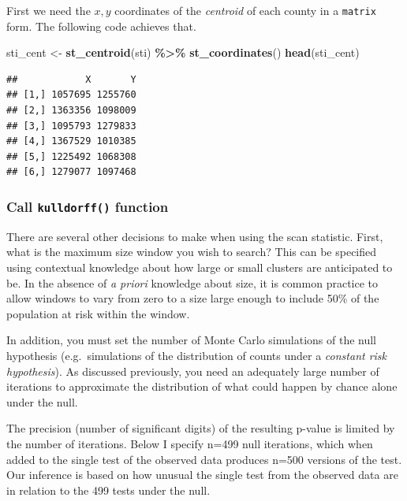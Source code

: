 \documentclass[
]{book}
\newenvironment{Shaded}{\begin{snugshade}}{\end{snugshade}}
\newcommand{\FunctionTok}[1]{\textcolor[rgb]{0.13,0.29,0.53}{\textbf{#1}}}
\newcommand{\NormalTok}[1]{#1}
\newcommand{\OtherTok}[1]{\textcolor[rgb]{0.56,0.35,0.01}{#1}}
\newcommand{\SpecialCharTok}[1]{\textcolor[rgb]{0.81,0.36,0.00}{\textbf{#1}}}
\begin{document}
First we need the \(x,y\) coordinates of the \emph{centroid} of each county in a \texttt{matrix} form. The following code achieves that.

\begin{Shaded}
\begin{Highlighting}[]
\NormalTok{sti\_cent }\OtherTok{\textless{}{-}} \FunctionTok{st\_centroid}\NormalTok{(sti) }\SpecialCharTok{\%\textgreater{}\%}
  \FunctionTok{st\_coordinates}\NormalTok{()}
\FunctionTok{head}\NormalTok{(sti\_cent)}
\end{Highlighting}
\end{Shaded}

\begin{verbatim}
##            X       Y
## [1,] 1057695 1255760
## [2,] 1363356 1098009
## [3,] 1095793 1279833
## [4,] 1367529 1010385
## [5,] 1225492 1068308
## [6,] 1279077 1097468
\end{verbatim}

\hypertarget{call-kulldorff-function}{%
\subsubsection{\texorpdfstring{Call \texttt{kulldorff()} function}{Call kulldorff() function}}\label{call-kulldorff-function}}

There are several other decisions to make when using the scan statistic. First, what is the maximum size window you wish to search? This can be specified using contextual knowledge about how large or small clusters are anticipated to be. In the absence of \emph{a priori} knowledge about size, it is common practice to allow windows to vary from zero to a size large enough to include 50\% of the population at risk within the window.

In addition, you must set the number of Monte Carlo simulations of the null hypothesis (e.g.~simulations of the distribution of counts under a \emph{constant risk hypothesis}). As discussed previously, you need an adequately large number of iterations to approximate the distribution of what could happen by chance alone under the null.

The precision (number of significant digits) of the resulting p-value is limited by the number of iterations. Below I specify n=499 null iterations, which when added to the single test of the observed data produces n=500 versions of the test. Our inference is based on how unusual the single test from the observed data are in relation to the 499 tests under the null.
\end{document}
